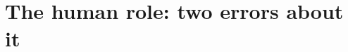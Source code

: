 \documentclass[11pt]{article}
\numberwithin{equation}{section}
\theoremstyle{plain}
\theoremstyle{definition}
\theoremstyle{remark}
\begin{document}

\section{The human role: two errors about it}\label{hr:sec}
\end{document}
